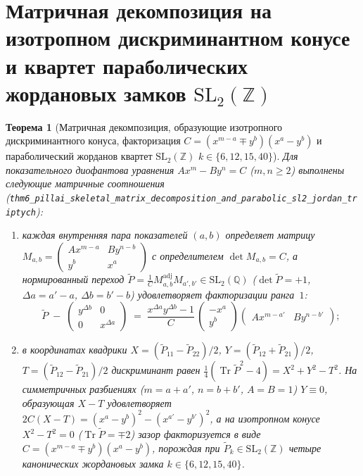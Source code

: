 \documentclass[11pt,a4paper]{article}
\theoremstyle{plain}
\newtheorem{theorem}{Теорема}[section]
\theoremstyle{definition}
\begin{document}
\section{Матричная декомпозиция на изотропном дискриминантном конусе и квартет параболических жордановых замков \texorpdfstring{$\mathrm{SL}_2(\mathbb{Z})$}{SL2(Z)}}
\label{sec:isotropic-cone}

\begin{theorem}[Матричная декомпозиция, образующие изотропного дискриминантного конуса, факторизация $C = (x^{m-a}\mp y^b)(x^a-y^b)$ и параболический жорданов квартет $\mathrm{SL}_2(\mathbb{Z})$ $k\in\{6,12,15,40\}$]
\label{thm:main-6}
Для показательного диофантова уравнения $A x^m - B y^n = C$ ($m,n\ge 2$) выполнены следующие матричные соотношения (\texttt{thm6\_pillai\_skeletal\_matrix\_decomposition\_and\_parabolic\_sl2\_jordan\_triptych}):
\begin{enumerate}[label=\textbf{(\roman*)},leftmargin=*]
\item каждая внутренняя пара показателей $(a,b)$ определяет матрицу $M_{a,b} = \begin{pmatrix} A x^{m-a} & B y^{n-b} \\ y^b & x^a \end{pmatrix}$ с определителем $\det M_{a,b} = C$, а нормированный переход $\widetilde{P} = \frac{1}{C} M_{a,b}^{\mathrm{adj}} M_{a',b'}\in\mathrm{SL}_2(\mathbb{Q})$ ($\det\widetilde{P} = +1$, $\Delta a = a'-a$, $\Delta b = b'-b$) удовлетворяет факторизации ранга~$1$:
  \[
    \widetilde{P} \;-\; \begin{pmatrix} y^{\Delta b} & 0 \\ 0 & x^{\Delta a} \end{pmatrix}
    \;=\; \frac{x^{\Delta a}y^{\Delta b}-1}{C}\,\begin{pmatrix} -x^a \\ y^b \end{pmatrix}\begin{pmatrix} A x^{m-a'} & B y^{n-b'} \end{pmatrix};
  \]
\item в координатах квадрики $X = (\widetilde{P}_{11}-\widetilde{P}_{22})/2$, $Y = (\widetilde{P}_{12}+\widetilde{P}_{21})/2$, $T = (\widetilde{P}_{12}-\widetilde{P}_{21})/2$ дискриминант равен $\frac{1}{4}(\operatorname{Tr}\widetilde{P}^2 - 4) = X^2 + Y^2 - T^2$. На симметричных разбиениях ($m=a+a'$, $n=b+b'$, $A=B=1$) $Y\equiv 0$, образующая $X - T$ удовлетворяет $2C(X - T) = (x^a - y^b)^2 - (x^{a'} - y^{b'})^2$, а на изотропном конусе $X^2 - T^2 = 0$ ($\operatorname{Tr}\widetilde{P} = \mp 2$) зазор факторизуется в виде $C = (x^{m-a}\mp y^b)(x^a - y^b)$, порождая при $\widetilde{P}_k\in\mathrm{SL}_2(\mathbb{Z})$ четыре канонических жордановых замка $k\in\{6,12,15,40\}$.
\end{enumerate}
\end{theorem}
\end{document}
